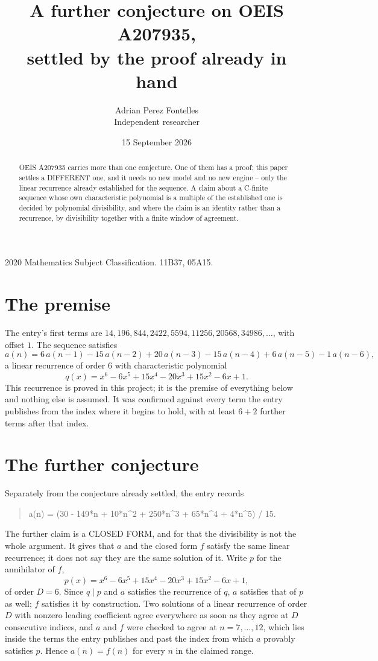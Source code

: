 \documentclass[11pt,a4paper]{article}
\title{A further conjecture on OEIS A207935,\\ \large settled by the proof already in hand}
\author{Adrian Perez Fontelles\\ \small Independent researcher}
\date{15 September 2026}
\theoremstyle{plain}
\theoremstyle{definition}
\begin{document}
\maketitle

\begin{abstract}
OEIS A207935 carries more than one conjecture. One of them has a proof; this paper settles a
DIFFERENT one, and it needs no new model and no new engine -- only the linear recurrence already
established for the sequence. A claim about a C-finite sequence whose own characteristic
polynomial is a multiple of the established one is decided by polynomial divisibility, and where
the claim is an identity rather than a recurrence, by divisibility together with a finite window
of agreement.
\end{abstract}

\noindent\small 2020 Mathematics Subject Classification. 11B37, 05A15.\normalsize

\section{The premise}

The entry's first terms are $14, 196, 844, 2422, 5594, 11256, 20568, 34986,\dots$, with offset $1$. The sequence satisfies
\[
  a(n)=6\,a(n-1) - 15\,a(n-2) + 20\,a(n-3) - 15\,a(n-4) + 6\,a(n-5) - 1\,a(n-6) ,
\]
a linear recurrence of order $6$ with characteristic polynomial
\[
  q(x)=x^{6} - 6 x^{5} + 15 x^{4} - 20 x^{3} + 15 x^{2} - 6 x + 1 .
\]
This recurrence is proved in this project; it is the premise of everything below and nothing else is assumed.
It was confirmed against every term the entry publishes from the index where it begins to hold,
with at least $6+2$ further terms after that index.

\section{The further conjecture}

Separately from the conjecture already settled, the entry records

\begin{quote}\raggedright a(n) = (30 - 149*n + 10*n\^{}2 + 250*n\^{}3 + 65*n\^{}4 + 4*n\^{}5) / 15.\end{quote}

The further claim is a CLOSED FORM, and for that the divisibility is not the whole argument. It
gives that $a$ and the closed form $f$ satisfy the same linear recurrence; it does not say they
are the same solution of it. Write $p$ for the annihilator of $f$,
\[
  p(x)=x^{6} - 6 x^{5} + 15 x^{4} - 20 x^{3} + 15 x^{2} - 6 x + 1 ,
\]
of order $D=6$. Since $q\mid p$ and $a$ satisfies the recurrence of $q$, $a$ satisfies that of
$p$ as well; $f$ satisfies it by construction. Two solutions of a linear recurrence of order $D$
with nonzero leading coefficient agree everywhere as soon as they agree at $D$ consecutive
indices, and $a$ and $f$ were checked to agree at $n=7,\dots,12$,
which lies inside the terms the entry publishes and past the index from which $a$ provably
satisfies $p$. Hence $a(n)=f(n)$ for every $n$ in the claimed range.
\end{document}
